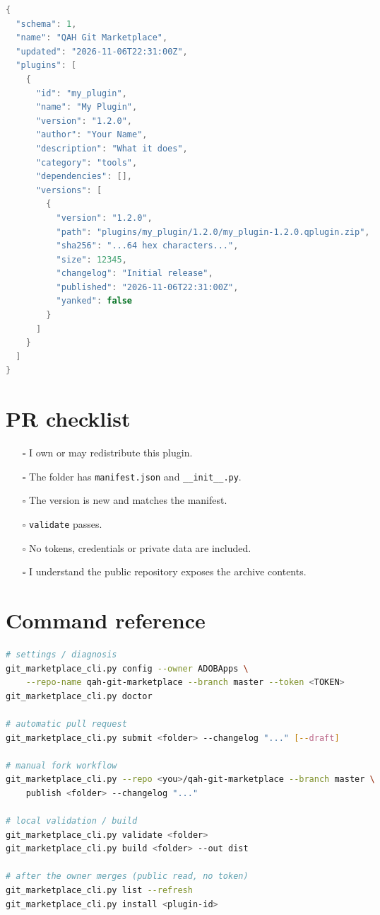 \documentclass[11pt,a4paper]{article}
\newcommand{\code}[1]{\texttt{#1}}
\begin{document}
\begin{lstlisting}[language=Java,caption={index.json (abridged)}]
{
  "schema": 1,
  "name": "QAH Git Marketplace",
  "updated": "2026-11-06T22:31:00Z",
  "plugins": [
    {
      "id": "my_plugin",
      "name": "My Plugin",
      "version": "1.2.0",
      "author": "Your Name",
      "description": "What it does",
      "category": "tools",
      "dependencies": [],
      "versions": [
        {
          "version": "1.2.0",
          "path": "plugins/my_plugin/1.2.0/my_plugin-1.2.0.qplugin.zip",
          "sha256": "...64 hex characters...",
          "size": 12345,
          "changelog": "Initial release",
          "published": "2026-11-06T22:31:00Z",
          "yanked": false
        }
      ]
    }
  ]
}
\end{lstlisting}

\section{PR checklist}

\begin{itemize}[leftmargin=1.5em]
  \item[$\square$] I own or may redistribute this plugin.
  \item[$\square$] The folder has \code{manifest.json} and \code{\_\_init\_\_.py}.
  \item[$\square$] The version is new and matches the manifest.
  \item[$\square$] \code{validate} passes.
  \item[$\square$] No tokens, credentials or private data are included.
  \item[$\square$] I understand the public repository exposes the archive contents.
\end{itemize}

\section{Command reference}

\begin{lstlisting}[language=bash,caption={Git Plugin Marketplace CLI}]
# settings / diagnosis
git_marketplace_cli.py config --owner ADOBApps \
    --repo-name qah-git-marketplace --branch master --token <TOKEN>
git_marketplace_cli.py doctor

# automatic pull request
git_marketplace_cli.py submit <folder> --changelog "..." [--draft]

# manual fork workflow
git_marketplace_cli.py --repo <you>/qah-git-marketplace --branch master \
    publish <folder> --changelog "..."

# local validation / build
git_marketplace_cli.py validate <folder>
git_marketplace_cli.py build <folder> --out dist

# after the owner merges (public read, no token)
git_marketplace_cli.py list --refresh
git_marketplace_cli.py install <plugin-id>
\end{lstlisting}
\end{document}
